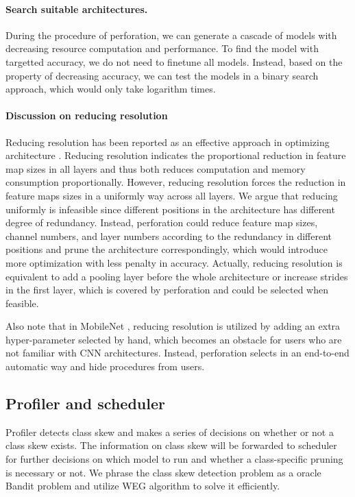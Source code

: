 \documentclass[pageno]{jpaper}
\begin{document}

\paragraph{Search suitable architectures.}
During the procedure of perforation, we can generate a cascade of models with decreasing resource computation and performance. To find the model with targetted accuracy, we do not need to finetune all models. Instead, based on the property of decreasing accuracy, we can test the models in a binary search approach, which would only take logarithm times.

\paragraph{Discussion on reducing resolution}
Reducing resolution has been reported as an effective approach in optimizing architecture \cite{krizhevsky2009learning, fu2017look, howard2017mobilenets}. Reducing resolution indicates the proportional reduction in feature map sizes in all layers and thus both reduces computation and memory consumption proportionally. However, reducing resolution forces the reduction in feature maps sizes in a uniformly way across all layers. We argue that reducing uniformly is infeasible since different positions in the architecture has different degree of redundancy. Instead, perforation could reduce feature map sizes, channel numbers, and layer numbers according to the redundancy in different positions and prune the architecture correspondingly, which would introduce more optimization with less penalty in accuracy. Actually, reducing resolution is equivalent to add a pooling layer before the whole architecture or increase strides in the first layer, which is covered by perforation and could be selected when feasible.

Also note that in MobileNet \cite{howard2017mobilenets}, reducing resolution is utilized by adding an extra hyper-parameter selected by hand, which becomes an obstacle for users who are not familiar with CNN architectures. Instead, perforation selects in an end-to-end automatic way and hide procedures from users.



\subsection{Profiler and scheduler} \label{profilerSection}
Profiler detects class skew and makes a series of decisions on whether or not a class skew exists. The information on class skew will be forwarded to scheduler for further decisions on which model to run and whether a class-specific pruning is necessary or not. We phrase the class skew detection problem as a oracle Bandit problem \cite{auer2002finite, lai1985asymptotically} and utilize WEG algorithm \cite{shen2016fast} to solve it efficiently.
\end{document}

